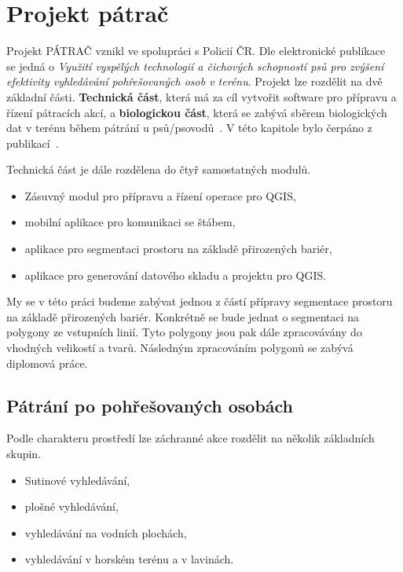 \chapter{Projekt pátrač} 
\label{chap:searchandrescue}

Projekt PÁTRAČ vznikl ve spolupráci s Policií ČR. Dle elektronické
publikace~\cite{chaloupkova2017vyuziti} se jedná o \textit{Využití
  vyspělých technologií a čichových schopností psů pro zvýšení
  efektivity vyhledávání pohřešovaných osob v terénu}. Projekt lze
rozdělit na dvě základní části. \textbf{Technická část}, která má za
cíl vytvořit software pro přípravu a řízení pátracích akcí, a
\textbf{biologickou část}, která se zabývá sběrem biologických dat v
terénu během pátrání u psů/psovodů~\cite{Zeman2009thesis}. V této
kapitole bylo čerpáno z publikací~\cite{sladkova2019aplikace,
  Zeman2009thesis, pavlista2009rizeni, zachrana}.
	
	Technická část je dále rozdělena do čtyř samostatných modulů.
\begin{itemize}
	\item Zásuvný modul pro přípravu a řízení operace pro QGIS,
	\item mobilní aplikace pro komunikaci se štábem,
	\item aplikace pro segmentaci prostoru na základě přirozených bariér,
	\item aplikace pro generování datového skladu a projektu pro QGIS.
\end{itemize}	
My se v této práci budeme zabývat jednou z částí přípravy segmentace
prostoru na základě přirozených bariér. Konkrétně se bude jednat o
segmentaci na polygony ze vstupních linií. Tyto polygony jsou pak dále
zpracovávány do vhodných velikostí a tvarů. Následným zpracováním
polygonů se zabývá diplomová práce.

\section{Pátrání po pohřešovaných osobách}
	Podle charakteru prostředí lze záchranné akce rozdělit na několik základních skupin.
	
\begin{itemize}
	\item Sutinové vyhledávání,
	\item plošné vyhledávání,
	\item vyhledávání na vodních plochách,
	\item vyhledávání v horském terénu a v lavinách.
\end{itemize}	
	
